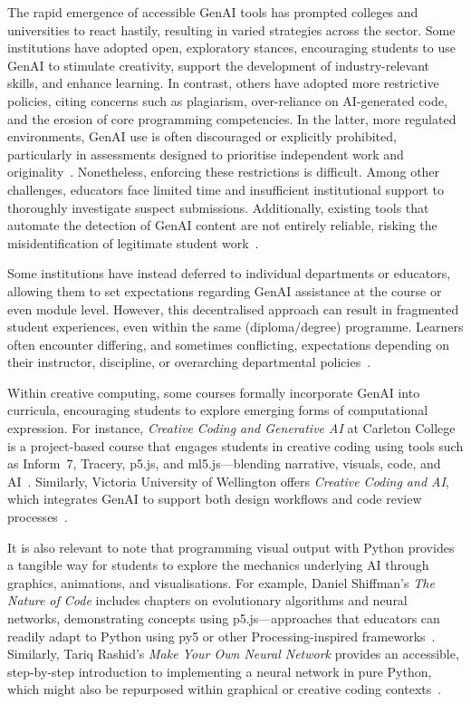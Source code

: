 The rapid emergence of accessible GenAI tools has prompted colleges and universities to react hastily, resulting in varied strategies across the sector. Some institutions have adopted open, exploratory stances, encouraging students to use GenAI to stimulate creativity, support the development of industry-relevant skills, and enhance learning. In contrast, others have adopted more restrictive policies, citing concerns such as plagiarism, over-reliance on AI-generated code, and the erosion of core programming competencies. In the latter, more regulated environments, GenAI use is often discouraged or explicitly prohibited, particularly in assessments designed to prioritise independent work and originality~\cite{mcdonald_generative_2025}. Nonetheless, enforcing these restrictions is difficult. Among other challenges, educators face limited time and insufficient institutional support to thoroughly investigate suspect submissions. Additionally, existing tools that automate the detection of GenAI content are not entirely reliable, risking the misidentification of legitimate student work~\cite{an_investigating_2025}. 

Some institutions have instead deferred to individual departments or educators, allowing them to set expectations regarding GenAI assistance at the course or even module level. However, this decentralised approach can result in fragmented student experiences, even within the same (diploma/degree) programme. Learners often encounter differing, and sometimes conflicting, expectations depending on their instructor, discipline, or overarching departmental policies~\cite{habel_anusas_2025, trinity_college_dublin_using_2025}.

Within creative computing, some courses formally incorporate GenAI into curricula, encouraging students to explore emerging forms of computational expression. For instance, \textit{Creative Coding and Generative AI} at Carleton College is a project-based course that engages students in creative coding using tools such as Inform~7, Tracery, p5.js, and ml5.js---blending narrative, visuals, code, and AI~\cite{salter_dgah_2025}. Similarly, Victoria University of Wellington offers \textit{Creative Coding and AI}, which integrates GenAI to support both design workflows and code review processes~\cite{victoria_university_of_wellington_dsdn_2025}.

It is also relevant to note that programming visual output with Python provides a tangible way for students to explore the mechanics underlying AI through graphics, animations, and visualisations. For example, Daniel Shiffman's \textit{The Nature of Code} includes chapters on evolutionary algorithms and neural networks, demonstrating concepts using p5.js---approaches that educators can readily adapt to Python using py5 or other Processing-inspired frameworks~\cite{shiffman_nature_2024}. Similarly, Tariq Rashid's \textit{Make Your Own Neural Network} provides an accessible, step-by-step introduction to implementing a neural network in pure Python, which might also be repurposed within graphical or creative coding contexts~\cite{rashid_make_2016}.

